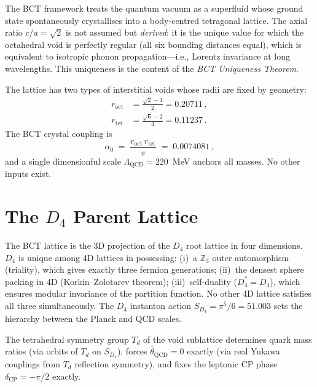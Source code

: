 \documentclass[aps,prl,reprint,superscriptaddress,showpacs]{revtex4-2}
\begin{document}
The BCT framework treats the quantum vacuum as a superfluid whose ground
state spontaneously crystallises into a body-centred tetragonal lattice.
The axial ratio $c/a = \sqrt{2}$ is not assumed but \emph{derived}:
it is the unique value for which the octahedral void is perfectly regular
(all six bounding distances equal), which is equivalent to isotropic
phonon propagation---i.e., Lorentz invariance at long wavelengths.
This uniqueness is the content of the \emph{BCT Uniqueness Theorem}.

The lattice has two types of interstitial voids whose radii are fixed
by geometry:
\begin{align}
  r_{\mathrm{oct}} &= \frac{\sqrt{2}-1}{2} = 0.20711\,, \label{eq:roct} \\
  r_{\mathrm{tet}} &= \frac{\sqrt{6}-2}{4} = 0.11237\,. \label{eq:rtet}
\end{align}
The BCT crystal coupling is
\begin{equation}
  \alpha_0 \;=\; \frac{r_{\mathrm{oct}}\, r_{\mathrm{tet}}}{\pi}
  \;=\; 0.0074081\,,
  \label{eq:alpha0}
\end{equation}
and a single dimensionful scale $\Lambda_{\mathrm{QCD}} = 220$~MeV
anchors all masses. No other inputs exist.

\section{The $D_4$ Parent Lattice}

The BCT lattice is the 3D projection of the $D_4$ root lattice in four
dimensions. $D_4$ is unique among 4D lattices in possessing:
(i)~a $\mathbb{Z}_3$ outer automorphism (triality), which gives exactly
three fermion generations;
(ii)~the densest sphere packing in 4D (Korkin--Zolotarev theorem);
(iii)~self-duality ($D_4^* = D_4$), which ensures modular invariance
of the partition function. No other 4D lattice satisfies all three
simultaneously. The $D_4$ instanton action
$S_{D_4} = \pi^5/6 = 51.003$
sets the hierarchy between the Planck and QCD scales.

The tetrahedral symmetry group $T_d$ of the void sublattice determines
quark mass ratios (via orbits of $T_d$ on $S_{D_4}$), forces
$\bar{\theta}_{\mathrm{QCD}} = 0$ exactly (via real Yukawa couplings
from $T_d$ reflection symmetry), and fixes the leptonic CP phase
$\delta_{\mathrm{CP}} = -\pi/2$ exactly.

\end{document}
